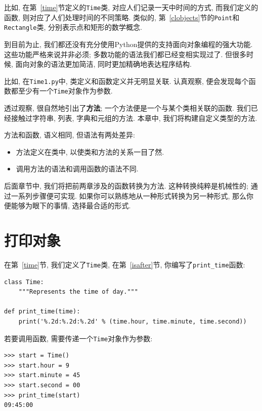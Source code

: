 \documentclass[10pt]{book}
\begin{document}
比如, 在第~\ref{time}节定义的{\tt Time}类, 对应人们记录一天中时间的方式, 
而我们定义的函数, 则对应了人们处理时间的不同策略. 
类似的, 第~\ref{clobjects}节的{\tt Point}和{\tt Rectangle}类, 
分别表示点和矩形的数学概念. 

到目前为止, 我们都还没有充分使用Python提供的支持面向对象编程的强大功能. 
这些功能严格来说并非必须;
多数功能的语法我们都已经变相实现过了. 
但很多时候, 面向对象的语法更加简洁, 同时更加精确地表达程序结构. 

比如, 在{\tt Time1.py}中, 类定义和函数定义并无明显关联. 
认真观察, 便会发现每个函数都至少有一个{\tt Time}对象作为参数. 

透过观察, 很自然地引出了{\bf 方法};
一个方法便是一个与某个类相关联的函数. 
我们已经接触过字符串, 列表, 字典和元组的方法. 
本章中, 我们将构建自定义类型的方法. 

方法和函数, 语义相同, 但语法有两处差异:

\begin{itemize}

\item 方法定义在类中, 以使类和方法的关系一目了然. 

\item 调用方法的语法和调用函数的语法不同. 

\end{itemize}

后面章节中, 我们将把前两章涉及的函数转换为方法. 
这种转换纯粹是机械性的; 通过一系列步骤便可实现. 
如果你可以熟练地从一种形式转换为另一种形式, 
那么你便能够为眼下的事情, 选择最合适的形式. 

\section{打印对象}

在第~\ref{time}节, 我们定义了{\tt Time}类, 在第~\ref{isafter}节, 
你编写了\verb"print_time"函数:

\begin{verbatim}
class Time:
    """Represents the time of day."""

def print_time(time):
    print('%.2d:%.2d:%.2d' % (time.hour, time.minute, time.second))
\end{verbatim}
%
若要调用函数, 需要传递一个{\tt Time}对象作为参数:

\begin{verbatim}
>>> start = Time()
>>> start.hour = 9
>>> start.minute = 45
>>> start.second = 00
>>> print_time(start)
09:45:00
\end{verbatim}
%
\end{document}
